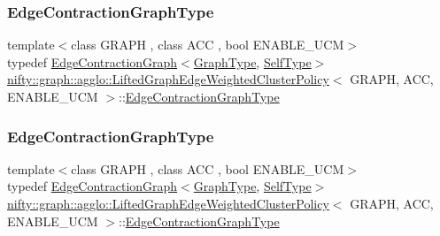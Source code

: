 \subsubsection{\texorpdfstring{Edge\+Contraction\+Graph\+Type}{EdgeContractionGraphType}\hspace{0.1cm}{\footnotesize\ttfamily [1/2]}}
{\footnotesize\ttfamily template$<$class G\+R\+A\+PH , class A\+CC , bool E\+N\+A\+B\+L\+E\+\_\+\+U\+CM$>$ \\
typedef \hyperlink{classnifty_1_1graph_1_1EdgeContractionGraph}{Edge\+Contraction\+Graph}$<$\hyperlink{classnifty_1_1graph_1_1agglo_1_1LiftedGraphEdgeWeightedClusterPolicy_a09555efd4d9896f60e2225f905a6600c}{Graph\+Type}, \hyperlink{classnifty_1_1graph_1_1agglo_1_1LiftedGraphEdgeWeightedClusterPolicy}{Self\+Type}$>$ \hyperlink{classnifty_1_1graph_1_1agglo_1_1LiftedGraphEdgeWeightedClusterPolicy}{nifty\+::graph\+::agglo\+::\+Lifted\+Graph\+Edge\+Weighted\+Cluster\+Policy}$<$ G\+R\+A\+PH, A\+CC, E\+N\+A\+B\+L\+E\+\_\+\+U\+CM $>$\+::\hyperlink{classnifty_1_1graph_1_1agglo_1_1LiftedGraphEdgeWeightedClusterPolicy_a20c8dc11217be76cda874a9ef9720e92}{Edge\+Contraction\+Graph\+Type}}

\mbox{\label{classnifty_1_1graph_1_1agglo_1_1LiftedGraphEdgeWeightedClusterPolicy_a20c8dc11217be76cda874a9ef9720e92}} 
\subsubsection{\texorpdfstring{Edge\+Contraction\+Graph\+Type}{EdgeContractionGraphType}\hspace{0.1cm}{\footnotesize\ttfamily [2/2]}}
{\footnotesize\ttfamily template$<$class G\+R\+A\+PH , class A\+CC , bool E\+N\+A\+B\+L\+E\+\_\+\+U\+CM$>$ \\
typedef \hyperlink{classnifty_1_1graph_1_1EdgeContractionGraph}{Edge\+Contraction\+Graph}$<$\hyperlink{classnifty_1_1graph_1_1agglo_1_1LiftedGraphEdgeWeightedClusterPolicy_a09555efd4d9896f60e2225f905a6600c}{Graph\+Type}, \hyperlink{classnifty_1_1graph_1_1agglo_1_1LiftedGraphEdgeWeightedClusterPolicy}{Self\+Type}$>$ \hyperlink{classnifty_1_1graph_1_1agglo_1_1LiftedGraphEdgeWeightedClusterPolicy}{nifty\+::graph\+::agglo\+::\+Lifted\+Graph\+Edge\+Weighted\+Cluster\+Policy}$<$ G\+R\+A\+PH, A\+CC, E\+N\+A\+B\+L\+E\+\_\+\+U\+CM $>$\+::\hyperlink{classnifty_1_1graph_1_1agglo_1_1LiftedGraphEdgeWeightedClusterPolicy_a20c8dc11217be76cda874a9ef9720e92}{Edge\+Contraction\+Graph\+Type}}

